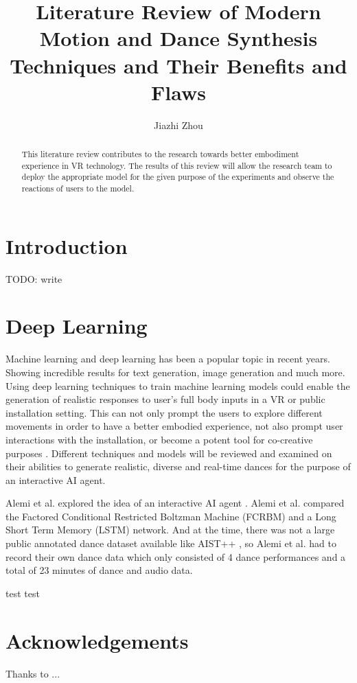 \documentclass[final,5p,times,twocolumn,authoryear]{article}
\begin{document}
\title{Literature Review of Modern Motion and Dance Synthesis Techniques and Their Benefits and Flaws}
\author{Jiazhi Zhou}
\maketitle

\begin{abstract}

This literature review contributes to the research towards better embodiment experience in VR technology. The results of this review will allow the research team to deploy the appropriate model for the given purpose of the experiments and observe the reactions of users to the model.

\end{abstract}

\section{Introduction}

TODO: write

\section{Deep Learning}

Machine learning and deep learning has been a popular topic in recent years. Showing incredible results for text generation, image generation and much more.
Using deep learning techniques to train machine learning models could enable the generation of realistic responses to user's full body inputs in a VR or public installation setting.
This can not only prompt the users to explore different movements in order to have a better embodied experience, not also prompt user interactions with the installation, or become a potent tool for co-creative purposes \cite{Wallace2023}.
Different techniques and models will be reviewed and examined on their abilities to generate realistic, diverse and real-time dances for the purpose of an interactive AI agent.

Alemi et al. explored the idea of an interactive AI agent \cite{Alemi2017}. Alemi et al. compared the Factored Conditional Restricted Boltzman Machine (FCRBM) and a Long Short Term Memory (LSTM) network. And at the time, there was not a large public annotated dance dataset available like AIST++ \cite{Li2021}, so Alemi et al. had to record their own dance data which only consisted of 4 dance performances and a total of 23 minutes of dance and audio data.

test test 

\section*{Acknowledgements}
Thanks to ...

 

\end{document}

